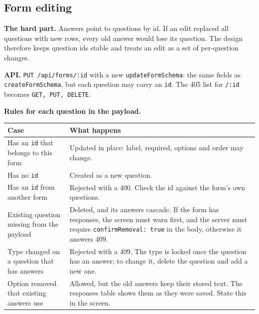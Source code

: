 \documentclass[11pt,a4paper]{article}
\begin{document}
\subsection{Form editing}
\textbf{The hard part.} Answers point to questions by id. If an edit replaced all questions with new rows, every old answer would lose its question. The design therefore keeps question ids stable and treats an edit as a set of per-question changes.

\textbf{API.} \texttt{PUT /api/forms/:id} with a new \texttt{updateFormSchema}: the same fields as \texttt{createFormSchema}, but each question may carry an \texttt{id}. The 405 list for \texttt{/:id} becomes \texttt{GET, PUT, DELETE}.

\textbf{Rules for each question in the payload.}
\begin{center}
\begin{tabular}{@{}p{4.4cm}p{10.2cm}@{}}
\toprule
\textbf{Case} & \textbf{What happens}\\
\midrule
Has an \texttt{id} that belongs to this form & Updated in place: label, required, options and order may change.\\
Has no \texttt{id} & Created as a new question.\\
Has an \texttt{id} from another form & Rejected with a 400. Check the id against the form's own questions.\\
Existing question missing from the payload & Deleted, and its answers cascade. If the form has responses, the screen must warn first, and the server must require \texttt{confirmRemoval: true} in the body, otherwise it answers 409.\\
Type changed on a question that has answers & Rejected with a 409. The type is locked once the question has an answer; to change it, delete the question and add a new one.\\
Option removed that existing answers use & Allowed, but the old answers keep their stored text. The responses table shows them as they were saved. State this in the screen.\\
\bottomrule
\end{tabular}
\end{center}
\end{document}
